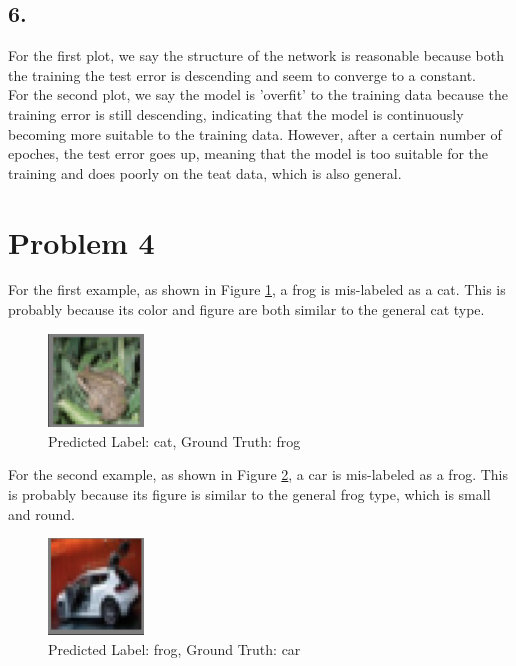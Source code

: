 \documentclass[twoside,12pt]{homework}
\begin{document}
\subsection*{6.}

For the first plot, we say the structure of the network is reasonable because both the training the test error is descending and seem to converge to a constant. \\

\noindent For the second plot, we say the model is 'overfit' to the training data because the training error is still descending, indicating that the model is continuously becoming more suitable to the training data. However, after a certain number of epoches, the test error goes up, meaning that the model is too suitable for the training and does poorly on the teat data, which is also general. 

\newpage

\section*{Problem 4}

For the first example, as shown in Figure \ref{fig12}, a frog is mis-labeled as a cat. This is probably because its color and figure are both similar to the general cat type. \\

\begin{figure}[!htb]
\begin{center}
\includegraphics[width=1in]{11.png}
\caption{Predicted Label: cat, Ground Truth: frog}
\label{fig12}
\end{center}
\end{figure}

\noindent For the second example, as shown in Figure \ref{fig13}, a car is mis-labeled as a frog. This is probably because its figure is similar to the general frog type, which is small and round. \\

\begin{figure}[!htb]
\begin{center}
\includegraphics[width=1in]{12.png}
\caption{Predicted Label: frog, Ground Truth: car}
\label{fig13}
\end{center}
\end{figure}
\end{document}

